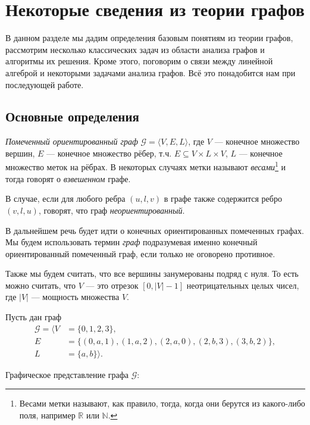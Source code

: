 \chapter{Некоторые сведения из теории графов}\label{chpt:GraphTheoryIntro}

В данном разделе мы дадим определения базовым понятиям из теории графов, рассмотрим несколько классических задач из области анализа графов и алгоритмы их решения. Кроме этого, поговорим о связи между линейной алгеброй и некоторыми задачами анализа графов.
Всё это понадобится нам при последующей работе.

\section{Основные определения}

\begin{definition}
  \textit{Помеченный ориентированный граф} $\mathcal{G} = \langle V, E, L \rangle$, где $V$ --- конечное множество вершин, $E$ --- конечное множество рёбер, т.ч. $E \subseteq V \times L \times V$, $L$ --- конечное множество меток на рёбрах. В некоторых случаях метки называют \textit{весами}\footnote{Весами метки называют, как правило, тогда, когда они берутся из какого-либо поля, например $\mathbb{R}$ или $\mathbb{N}$.} и тогда говорят о \textit{взвешенном} графе.
\end{definition}


\begin{definition}
  В случае, если для любого ребра $(u,l,v)$ в графе также содержится ребро $(v,l,u)$, говорят, что граф \textit{неориентированный}.
\end{definition}


В дальнейшем речь будет идти о конечных ориентированных помеченных графах.
Мы будем использовать термин \textit{граф} подразумевая именно конечный ориентированный помеченный граф, если только не оговорено противное.

Также мы будем считать, что все вершины занумерованы подряд с нуля.
То есть можно считать, что $V$ --- это отрезок $[0, |V| - 1]$ неотрицательных целых чисел, где $|V|$ --- мощность множества $V$.

\begin{example}
  Пусть дан граф
  \begin{align*}
    \mathcal{G} = \langle V&=\{0,1,2,3\},\\
                            E&=\{(0,a,1), (1,a,2), (2,a,0), (2,b,3), (3,b,2)\}, \\
                            L&=\{a,b\} \rangle.
  \end{align*}

  Графическое представление графа $\mathcal{G}$:
  \begin{center}
  
  \end{center}
\end{example}

